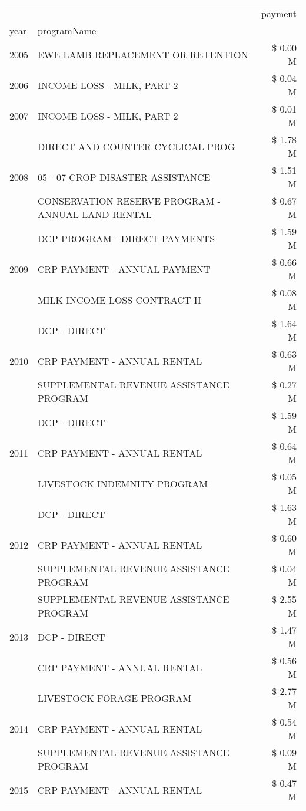 \begin{tabular}{llr}
\toprule
 &  & payment \\
year & programName &  \\
\midrule
2005 & EWE LAMB REPLACEMENT OR RETENTION & \$ 0.00 M \\
\cline{1-3}
2006 & INCOME LOSS - MILK, PART 2 & \$ 0.04 M \\
\cline{1-3}
2007 & INCOME LOSS - MILK, PART 2 & \$ 0.01 M \\
\cline{1-3}
\multirow[t]{3}{*}{2008} & DIRECT AND COUNTER CYCLICAL PROG & \$ 1.78 M \\
 & 05 - 07 CROP DISASTER ASSISTANCE & \$ 1.51 M \\
 & CONSERVATION RESERVE PROGRAM - ANNUAL LAND RENTAL & \$ 0.67 M \\
\cline{1-3}
\multirow[t]{3}{*}{2009} & DCP PROGRAM - DIRECT PAYMENTS & \$ 1.59 M \\
 & CRP PAYMENT - ANNUAL PAYMENT & \$ 0.66 M \\
 & MILK INCOME LOSS CONTRACT II & \$ 0.08 M \\
\cline{1-3}
\multirow[t]{3}{*}{2010} & DCP - DIRECT & \$ 1.64 M \\
 & CRP PAYMENT - ANNUAL RENTAL & \$ 0.63 M \\
 & SUPPLEMENTAL REVENUE ASSISTANCE PROGRAM & \$ 0.27 M \\
\cline{1-3}
\multirow[t]{3}{*}{2011} & DCP - DIRECT & \$ 1.59 M \\
 & CRP PAYMENT - ANNUAL RENTAL & \$ 0.64 M \\
 & LIVESTOCK INDEMNITY PROGRAM & \$ 0.05 M \\
\cline{1-3}
\multirow[t]{3}{*}{2012} & DCP - DIRECT & \$ 1.63 M \\
 & CRP PAYMENT - ANNUAL RENTAL & \$ 0.60 M \\
 & SUPPLEMENTAL REVENUE ASSISTANCE PROGRAM & \$ 0.04 M \\
\cline{1-3}
\multirow[t]{3}{*}{2013} & SUPPLEMENTAL REVENUE ASSISTANCE PROGRAM & \$ 2.55 M \\
 & DCP - DIRECT & \$ 1.47 M \\
 & CRP PAYMENT - ANNUAL RENTAL & \$ 0.56 M \\
\cline{1-3}
\multirow[t]{3}{*}{2014} & LIVESTOCK FORAGE PROGRAM & \$ 2.77 M \\
 & CRP PAYMENT - ANNUAL RENTAL & \$ 0.54 M \\
 & SUPPLEMENTAL REVENUE ASSISTANCE PROGRAM & \$ 0.09 M \\
\cline{1-3}
\multirow[t]{3}{*}{2015} & CRP PAYMENT - ANNUAL RENTAL & \$ 0.47 M \\

\end{tabular}
